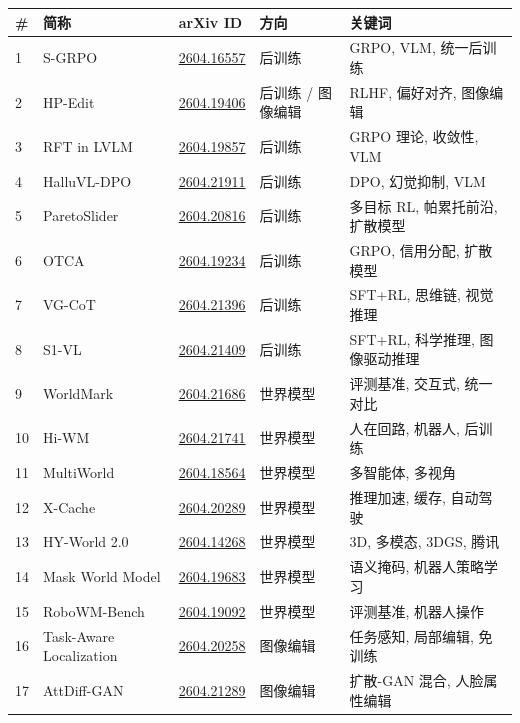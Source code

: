\small
\begin{longtable}{p{0.7cm}p{2.5cm}p{2.6cm}p{2.3cm}p{5.0cm}}
\toprule
\# & 简称 & arXiv ID & 方向 & 关键词 \\
\midrule
1 & S-GRPO & \href{https://arxiv.org/abs/2604.16557}{2604.16557} & 后训练 & GRPO, VLM, 统一后训练 \\
2 & HP-Edit & \href{https://arxiv.org/abs/2604.19406}{2604.19406} & 后训练 / 图像编辑 & RLHF, 偏好对齐, 图像编辑 \\
3 & RFT in LVLM & \href{https://arxiv.org/abs/2604.19857}{2604.19857} & 后训练 & GRPO 理论, 收敛性, VLM \\
4 & HalluVL-DPO & \href{https://arxiv.org/abs/2604.21911}{2604.21911} & 后训练 & DPO, 幻觉抑制, VLM \\
5 & ParetoSlider & \href{https://arxiv.org/abs/2604.20816}{2604.20816} & 后训练 & 多目标 RL, 帕累托前沿, 扩散模型 \\
6 & OTCA & \href{https://arxiv.org/abs/2604.19234}{2604.19234} & 后训练 & GRPO, 信用分配, 扩散模型 \\
7 & VG-CoT & \href{https://arxiv.org/abs/2604.21396}{2604.21396} & 后训练 & SFT+RL, 思维链, 视觉推理 \\
8 & S1-VL & \href{https://arxiv.org/abs/2604.21409}{2604.21409} & 后训练 & SFT+RL, 科学推理, 图像驱动推理 \\
9 & WorldMark & \href{https://arxiv.org/abs/2604.21686}{2604.21686} & 世界模型 & 评测基准, 交互式, 统一对比 \\
10 & Hi-WM & \href{https://arxiv.org/abs/2604.21741}{2604.21741} & 世界模型 & 人在回路, 机器人, 后训练 \\
11 & MultiWorld & \href{https://arxiv.org/abs/2604.18564}{2604.18564} & 世界模型 & 多智能体, 多视角 \\
12 & X-Cache & \href{https://arxiv.org/abs/2604.20289}{2604.20289} & 世界模型 & 推理加速, 缓存, 自动驾驶 \\
13 & HY-World 2.0 & \href{https://arxiv.org/abs/2604.14268}{2604.14268} & 世界模型 & 3D, 多模态, 3DGS, 腾讯 \\
14 & Mask World Model & \href{https://arxiv.org/abs/2604.19683}{2604.19683} & 世界模型 & 语义掩码, 机器人策略学习 \\
15 & RoboWM-Bench & \href{https://arxiv.org/abs/2604.19092}{2604.19092} & 世界模型 & 评测基准, 机器人操作 \\
16 & Task-Aware Localization & \href{https://arxiv.org/abs/2604.20258}{2604.20258} & 图像编辑 & 任务感知, 局部编辑, 免训练 \\
17 & AttDiff-GAN & \href{https://arxiv.org/abs/2604.21289}{2604.21289} & 图像编辑 & 扩散-GAN 混合, 人脸属性编辑 \\

\end{longtable}
